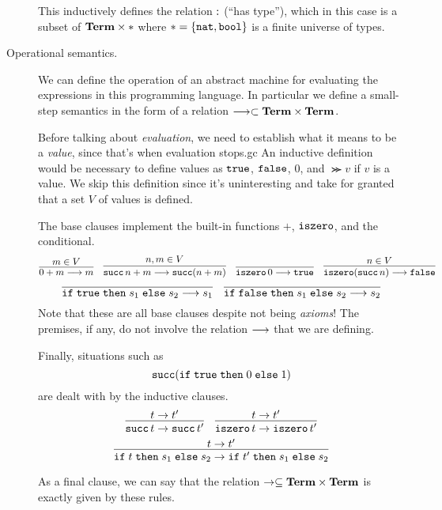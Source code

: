 \documentclass[11pt,letterpaper]{article}
\begin{document}
\begin{description}
        This inductively defines the relation $\operatorname{:}$ (``has type''), which
        in this case is a subset of $\mathbf{Term} \times *$ where
        $* = \{\mathtt{nat}, \mathtt{bool}\}$ is a finite universe of types.

    \item[Operational semantics.]
        We can define the operation of an abstract machine for evaluating the
        expressions in this programming language. In particular we define a
        small-step semantics in the form of a relation
        $\longrightarrow \subset \mathbf{Term} \times \mathbf{Term}$.

        Before talking about \emph{evaluation}, we need to establish what it
        means to be a \emph{value}, since that's when evaluation stops.gc
        An inductive definition would be necessary to define values as $\mathtt{true}$,
        $\mathtt{false}$, $0$, and $\Succ v$ if $v$ is a value.
        We skip this definition since it's uninteresting and take for granted
        that a set $V$ of values is defined.

        The base clauses implement the built-in functions
        $+$, $\operatorname{\mathtt{iszero}}$, and the conditional.
        $$
        \infer{0 + m \evalto m}{m \in V}
        \quad
        \infer{\Succ n + m \evalto \Succ (n + m)}{n, m \in V}
        \quad
        \infer{\iszero 0 \evalto \true}{}
        \quad
        \infer{\iszero (\Succ n) \evalto \false}{n \in V}
        $$
        $$
        \infer{\ifthenelse{\true}{s_1}{s_2} \evalto s_1}{}
        \quad
        \infer{\ifthenelse{\false}{s_1}{s_2} \evalto s_2}{}
        $$
        Note that these are all base clauses despite not being \emph{axioms}!
        The premises, if any, do not involve the relation $\longrightarrow$ that we are
        defining.

        Finally, situations such as
        $$
        \operatorname{\mathtt{succ}} (\mathtt{if}\; \mathtt{true} \;\mathtt{then}\; 0 \;\mathtt{else}\; 1)
        $$
        are dealt with by the inductive clauses.
        $$
        \infer{\Succ t \to \Succ t^\prime}{t \to t^\prime}
        \quad
        \infer{\iszero t \to \iszero t^\prime}{t \to t^\prime}
        $$
        $$
        \infer{
            \ifthenelse{t}{s_1}{s_2}
            \to
            \ifthenelse{t^\prime}{s_1}{s_2}
        }{
            t \to t^\prime
        }
        $$

        As a final clause, we can say that the relation
        $\to \subseteq \mathbf{Term} \times \mathbf{Term}$ is exactly given by these rules.
\end{description}
\end{document}
